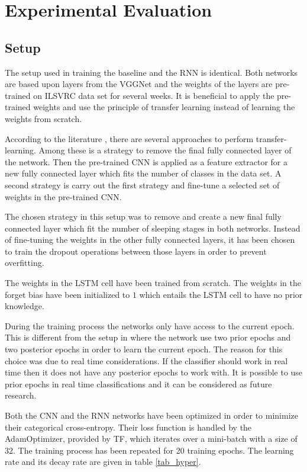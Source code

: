 \section{Experimental Evaluation}
\subsection{Setup}

The setup used in training the baseline and the RNN is identical. Both networks are based upon layers from the VGGNet and the weights of the layers are pre-trained on ILSVRC data set for several weeks. It is beneficial to apply the pre-trained weights and use the principle of transfer learning instead of learning the weights from scratch. 

According to the literature \cite{stand_cnn_notes_1}, there are several approaches to perform transfer-learning. Among these is a strategy to remove the final fully connected layer of the network. Then the pre-trained CNN is applied as a feature extractor for a new fully connected layer which fits the number of classes in the data set.
A second strategy is carry out the first strategy and fine-tune a selected set of weights in the pre-trained CNN.

The chosen strategy in this setup was to remove and create a new final fully connected layer which fit the number of sleeping stages in both networks. Instead of fine-tuning the weights in the other fully connected layers, it has been chosen to train the dropout operations between those layers in order to prevent overfitting. 

The weights in the LSTM cell have been trained from scratch. The weights in the forget bias have been initialized to $1$ which entails the LSTM cell to have no prior knowledge.

During the training process the networks only have access to the current epoch. This is different from the setup in \cite{main_ar} where the network use two prior epochs and two posterior epochs in order to learn the current epoch. The reason for this choice was due to real time considerations. If the classifier should work in real time then it does not have any posterior epochs to work with. 
It is possible to use prior epochs in real time classifications and it can be considered as future research.

Both the CNN and the RNN networks have been optimized in order to minimize their categorical cross-entropy. Their loss function is handled by the AdamOptimizer, provided by TF, which iterates over a mini-batch with a size of 32. 
The training process has been repeated for 20 training epochs. The learning rate and its decay rate are given in table \ref{tab_hyper}. 

